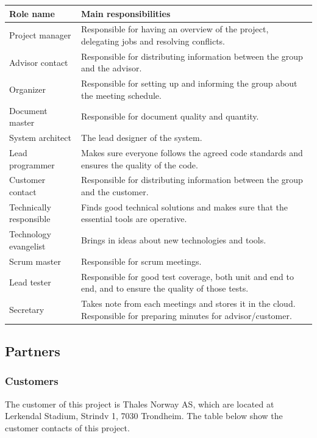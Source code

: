 \begin{tabular}{|l | p{10cm}|}
	\hline
	\textbf{Role name} & \textbf{Main responsibilities}  \\ \hline
	Project manager & Responsible for having an overview of the project, delegating jobs and resolving conflicts. \\ \hline
	Advisor contact & Responsible for distributing information between the group and the advisor. \\ \hline
	Organizer & Responsible for setting up and informing the group about the meeting schedule. \\ \hline
	Document master & Responsible for document quality and quantity. \\ \hline
	System architect & The lead designer of the system. \\ \hline
	Lead programmer & Makes sure everyone follows the agreed code standards and ensures the quality of the code. \\ \hline
	Customer contact & Responsible for distributing information between the group and the customer. \\ \hline
	Technically responsible & Finds good technical solutions and makes sure that the essential tools are operative. \\ \hline
	Technology evangelist & Brings in ideas about new technologies and tools. \\ \hline
	Scrum master & Responsible for scrum meetings. \\ \hline
	Lead tester & Responsible for good test coverage, both unit and end to end, and to ensure the quality of those tests. \\ \hline
	Secretary & Takes note from each meetings and stores it in the cloud. Responsible for preparing minutes for advisor/customer. \\ \hline

\end{tabular}

\subsection{Partners}

\subsubsection{Customers}
The customer of this project is Thales Norway AS, which are located at Lerkendal Stadium, Strindv 1, 7030 Trondheim.
The table below show the customer contacts of this project.

